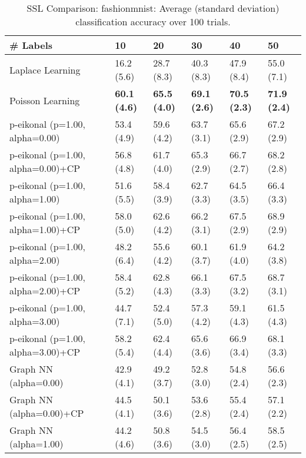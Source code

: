 \documentclass{article}
\begin{document}
\begin{table*}[t!]
\vspace{-3mm}
\caption{SSL Comparison: fashionmnist: Average (standard deviation) classification accuracy over 100 trials.}
\vspace{-3mm}
\label{tab:SSL Comparison: fashionmnist}
\vskip 0.15in
\begin{center}
\begin{small}
\begin{sc}
\begin{tabular}{llllll}
\toprule
\# Labels&\textbf{10}&\textbf{20}&\textbf{30}&\textbf{40}&\textbf{50}\\
\midrule
Laplace Learning&16.2 (5.6)      &28.7 (8.3)      &40.3 (8.3)      &47.9 (8.4)      &55.0 (7.1)      \\
Poisson Learning&{\bf 60.1 (4.6)}&{\bf 65.5 (4.0)}&{\bf 69.1 (2.6)}&{\bf 70.5 (2.3)}&{\bf 71.9 (2.4)}\\
p-eikonal (p=1.00, alpha=0.00)&53.4 (4.9)      &59.6 (4.2)      &63.7 (3.1)      &65.6 (2.9)      &67.2 (2.9)      \\
p-eikonal (p=1.00, alpha=0.00)+CP&56.8 (4.8)      &61.7 (4.0)      &65.3 (2.9)      &66.7 (2.7)      &68.2 (2.8)      \\
p-eikonal (p=1.00, alpha=1.00)&51.6 (5.5)      &58.4 (3.9)      &62.7 (3.3)      &64.5 (3.5)      &66.4 (3.3)      \\
p-eikonal (p=1.00, alpha=1.00)+CP&58.0 (5.0)      &62.6 (4.2)      &66.2 (3.1)      &67.5 (2.9)      &68.9 (2.9)      \\
p-eikonal (p=1.00, alpha=2.00)&48.2 (6.4)      &55.6 (4.2)      &60.1 (3.7)      &61.9 (4.0)      &64.2 (3.8)      \\
p-eikonal (p=1.00, alpha=2.00)+CP&58.4 (5.2)      &62.8 (4.3)      &66.1 (3.3)      &67.5 (3.2)      &68.7 (3.1)      \\
p-eikonal (p=1.00, alpha=3.00)&44.7 (7.1)      &52.4 (5.0)      &57.3 (4.2)      &59.1 (4.3)      &61.5 (4.3)      \\
p-eikonal (p=1.00, alpha=3.00)+CP&58.2 (5.4)      &62.4 (4.4)      &65.6 (3.6)      &66.9 (3.4)      &68.1 (3.3)      \\
Graph NN (alpha=0.00)&42.9 (4.1)      &49.2 (3.7)      &52.8 (3.0)      &54.8 (2.4)      &56.6 (2.3)      \\
Graph NN (alpha=0.00)+CP&44.5 (4.1)      &50.1 (3.6)      &53.6 (2.8)      &55.4 (2.4)      &57.1 (2.2)      \\
Graph NN (alpha=1.00)&44.2 (4.6)      &50.8 (3.6)      &54.5 (3.0)      &56.4 (2.5)      &58.5 (2.5)      \\

\end{tabular}
\end{sc}
\end{small}
\end{center}
\end{table*}
\end{document}
